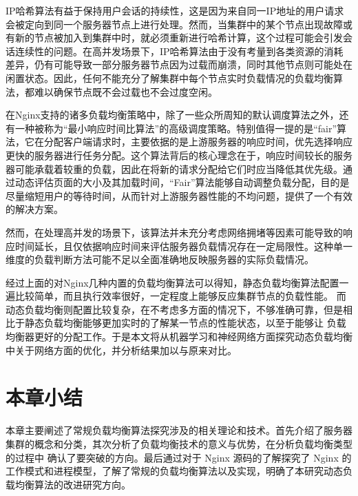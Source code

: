 IP哈希算法有益于保持用户会话的持续性，这是因为来自同一IP地址的用户请求会被定向到同一个服务器节点上进行处理。然而，当集群中的某个节点出现故障或有新的节点被加入到集群中时，就必须重新进行哈希计算，这个过程可能会引发会话连续性的问题。在高并发场景下，IP哈希算法由于没有考量到各类资源的消耗差异，仍有可能导致一部分服务器节点因为过载而崩溃，同时其他节点则可能处在闲置状态。因此，任何不能充分了解集群中每个节点实时负载情况的负载均衡算法，都难以确保节点既不会过载也不会过度空闲。

在Nginx支持的诸多负载均衡策略中，除了一些众所周知的默认调度算法之外，还有一种被称为“最小响应时间比算法”的高级调度策略。特别值得一提的是“fair”算法，它在分配客户端请求时，主要依据的是上游服务器的响应时间，优先选择响应更快的服务器进行任务分配。这个算法背后的核心理念在于，响应时间较长的服务器可能承载着较重的负载，因此在将新的请求分配给它们时应当降低其优先级。通过动态评估页面的大小及其加载时间，“Fair”算法能够自动调整负载分配，目的是尽量缩短用户的等待时间，从而针对上游服务器性能的不均问题，提供了一个有效的解决方案。

然而，在处理高并发的场景下，该算法并未充分考虑网络拥堵等因素可能导致的响应时间延长，且仅依据响应时间来评估服务器负载情况存在一定局限性。这种单一维度的负载判断方法可能不足以全面准确地反映服务器的实际负载情况\cite{张艳肖2023基于Fair函数神经网络的厚度传感器输出特性分析}。

经过上面的对Nginx几种内置的负载均衡算法可以得知，静态负载均衡算法配置一遍比较简单，而且执行效率很好，一定程度上能够反应集群节点的负载性能。
而动态负载均衡则配置比较复杂，在不考虑多方面的情况下，不够准确可靠，但是相比于静态负载均衡能够更加实时的了解某一节点的性能状态，以至于能够让
负载均衡器更好的分配工作。于是本文将从机器学习和神经网络方面探究动态负载均衡中关于网络方面的优化，并分析结果加以与原来对比。

\section{本章小结}

本章主要阐述了常规负载均衡算法探究涉及的相关理论和技术。首先介绍了服务器集群的概念和分类，其次分析了负载均衡技术的意义与优势，在分析负载均衡类型的过程中
确认了要突破的方向。最后通过对于 Nginx 源码的了解探究了 Nginx 的工作模式和进程模型，了解了常规的负载均衡算法以及实现，明确了本研究动态负载均衡算法的改进研究方向。
